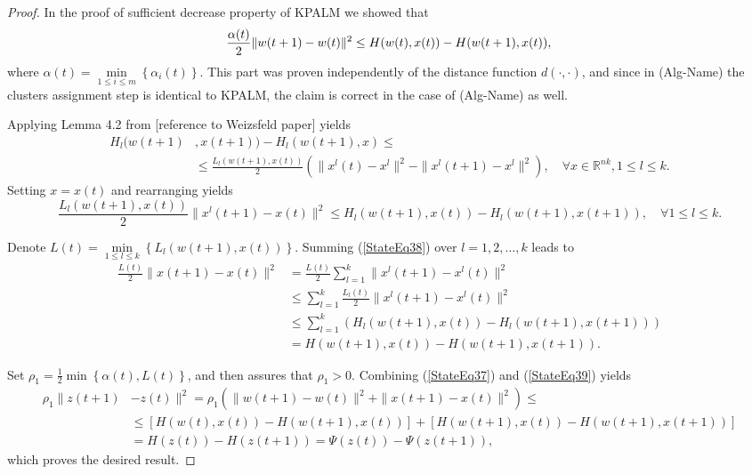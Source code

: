 \documentclass[11pt]{article}
\numberwithin{equation}{section}
\begin{document}
\begin{proof}
In the proof of sufficient decrease property of KPALM we showed that
\begin{equation}
	\frac{\alpha(t)}{2} \|w(t+1) - w(t)\|^2 \leq H(w(t),x(t)) - H(w(t+1),x(t)) , \\ \label{StateEq37}
\end{equation}
where $\alpha(t) = \min\limits_{1 \leq i \leq m} \left\lbrace \alpha_i(t) \right\rbrace$. This part was proven independently of the distance function $d(\cdot, \cdot)$, and since in (Alg-Name) the clusters assignment step is identical to KPALM, the claim is correct in the case of (Alg-Name) as well.

Applying Lemma 4.2 from [reference to Weizsfeld paper] yields
\begin{equation*}
	\begin{split}
	H_l(w(t+1)&,x(t+1)) - H_l(w(t+1),x) \leq \\ 
	& \leq \frac{L_l(w(t+1),x(t))}{2} \left( \|x^l(t) - x^l\|^2 - \|x^l(t+1) - x^l\|^2 \right), \quad \forall x \in \mathbb{R}^{nk}, 1 \leq l \leq k .
	\end{split}
\end{equation*}
Setting $x = x(t)$ and rearranging yields
\begin{equation}
	\frac{L_l(w(t+1),x(t))}{2} \|x^l(t+1) - x(t)\|^2 \leq H_l(w(t+1),x(t)) - H_l(w(t+1),x(t+1)), \quad \forall 1 \leq l \leq k . \label{StateEq38}
\end{equation}

Denote ${L(t)}= \min\limits_{1 \leq l \leq k} \left\lbrace L_l(w(t+1),x(t)) \right\rbrace$. Summing (\ref{StateEq38}) over $l = 1,2, \ldots ,k$ leads to
\begin{equation}
	\begin{split}
	\frac{L(t)}{2} \|x(t+1) - x(t)\|^2 &= 
	\frac{L(t)}{2} \sum\limits_{l=1}^{k} \|x^l(t+1) - x^l(t)\|^2 \\
	& \leq \sum\limits_{l=1}^{k} \frac{L_l(t)}{2} \|x^l(t+1) - x^l(t)\|^2 \\
	& \leq \sum\limits_{l=1}^{k} \left( H_l(w(t+1),x(t)) - H_l(w(t+1),x(t+1)) \right) \\
	& = H(w(t+1),x(t)) - H(w(t+1),x(t+1)) .
	\end{split} \label{StateEq39}
\end{equation}

Set $\rho_1 = \frac{1}{2} \min \left\lbrace \alpha(t), L(t) \right\rbrace$, and then  assures that $\rho_1 > 0$. Combining (\ref{StateEq37}) and (\ref{StateEq39}) yields
\begin{equation*}
\begin{aligned}
	\rho_1 \|z(t+1) &- z(t)\|^2 
	 = \rho_1 \left( \|w(t+1) - w(t)\|^2 + \|x(t+1) - x(t)\|^2  \right) \leq \\
	& \leq \left[ H(w(t),x(t)) - H(w(t+1),x(t)) \right] + \left[ H(w(t+1),x(t)) - H(w(t+1),x(t+1)) \right] \\
	& = H(z(t)) - H(z(t+1)) = \Psi(z(t)) - \Psi(z(t+1)),
\end{aligned}
\end{equation*}
which proves the desired result.
\end{proof}
\end{document}
